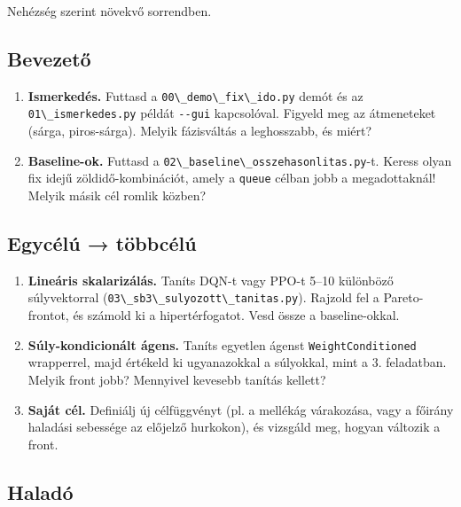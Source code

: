 Nehézség szerint növekvő sorrendben.

\hypertarget{bevezetux151}{%
\subsection{Bevezető}\label{bevezetux151}}

\begin{enumerate}
\def\labelenumi{\arabic{enumi}.}
\tightlist
\item
  \textbf{Ismerkedés.} Futtasd a
  \passthrough{\lstinline!00\_demo\_fix\_ido.py!}
  demót és az
  \passthrough{\lstinline!01\_ismerkedes.py!}
  példát \passthrough{\lstinline!--gui!}
  kapcsolóval. Figyeld meg az
  átmeneteket (sárga, piros-sárga).
  Melyik fázisváltás a leghosszabb, és
  miért?
\item
  \textbf{Baseline-ok.} Futtasd a
  \passthrough{\lstinline!02\_baseline\_osszehasonlitas.py!}-t.
  Keress olyan fix idejű
  zöldidő-kombinációt, amely a
  \passthrough{\lstinline!queue!} célban
  jobb a megadottaknál! Melyik másik cél
  romlik közben?
\end{enumerate}

\hypertarget{egycuxe9luxfa--tuxf6bbcuxe9luxfa}{%
\subsection{Egycélú →
többcélú}\label{egycuxe9luxfa--tuxf6bbcuxe9luxfa}}

\begin{enumerate}
\def\labelenumi{\arabic{enumi}.}
\setcounter{enumi}{2}
\tightlist
\item
  \textbf{Lineáris skalarizálás.} Taníts
  DQN-t vagy PPO-t 5--10 különböző
  súlyvektorral
  (\passthrough{\lstinline!03\_sb3\_sulyozott\_tanitas.py!}).
  Rajzold fel a Pareto-frontot, és
  számold ki a hipertérfogatot. Vesd
  össze a baseline-okkal.
\item
  \textbf{Súly-kondicionált ágens.}
  Taníts egyetlen ágenst
  \passthrough{\lstinline!WeightConditioned!}
  wrapperrel, majd értékeld ki
  ugyanazokkal a súlyokkal, mint a 3.
  feladatban. Melyik front jobb?
  Mennyivel kevesebb tanítás kellett?
\item
  \textbf{Saját cél.} Definiálj új
  célfüggvényt (pl. a mellékág
  várakozása, vagy a főirány haladási
  sebessége az előjelző hurkokon), és
  vizsgáld meg, hogyan változik a front.
\end{enumerate}

\hypertarget{haladuxf3}{%
\subsection{Haladó}\label{haladuxf3}}

